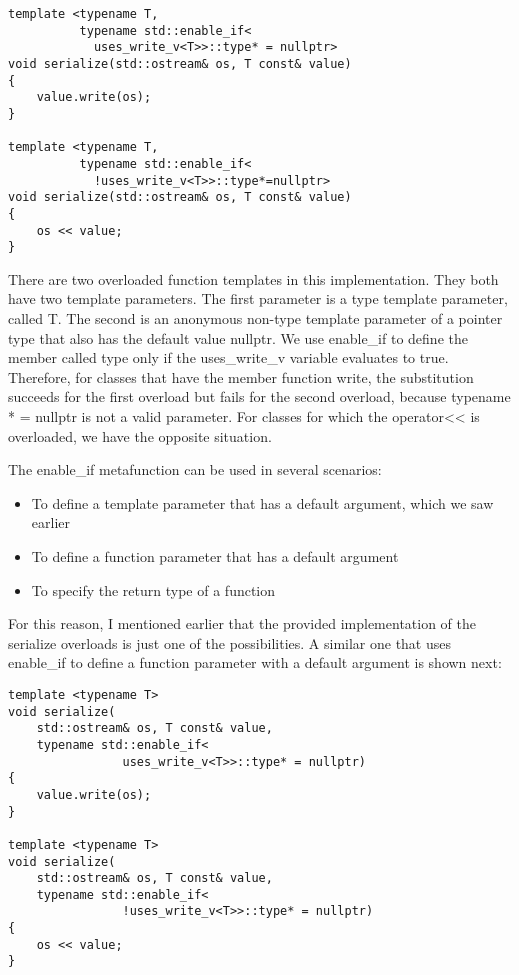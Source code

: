 \begin{lstlisting}[style=styleCXX]
template <typename T,
		  typename std::enable_if<
			uses_write_v<T>>::type* = nullptr>
void serialize(std::ostream& os, T const& value)
{
	value.write(os);
}

template <typename T,
		  typename std::enable_if<
			!uses_write_v<T>>::type*=nullptr>
void serialize(std::ostream& os, T const& value)
{
	os << value;
}
\end{lstlisting}

There are two overloaded function templates in this implementation. They both have two template parameters. The first parameter is a type template parameter, called T. The second is an anonymous non-type template parameter of a pointer type that also has the default value nullptr. We use enable\_if to define the member called type only if the uses\_write\_v variable evaluates to true. Therefore, for classes that have the member function write, the substitution succeeds for the first overload but fails for the second overload, because typename * = nullptr is not a valid parameter. For classes for which the operator<{}< is overloaded, we have the opposite situation.

The enable\_if metafunction can be used in several scenarios:

\begin{itemize}
\item
To define a template parameter that has a default argument, which we saw earlier

\item
To define a function parameter that has a default argument

\item
To specify the return type of a function
\end{itemize}

For this reason, I mentioned earlier that the provided implementation of the serialize overloads is just one of the possibilities. A similar one that uses enable\_if to define a function parameter with a default argument is shown next:

\begin{lstlisting}[style=styleCXX]
template <typename T>
void serialize(
	std::ostream& os, T const& value,
	typename std::enable_if<
				uses_write_v<T>>::type* = nullptr)
{
	value.write(os);
}

template <typename T>
void serialize(
	std::ostream& os, T const& value,
	typename std::enable_if<
				!uses_write_v<T>>::type* = nullptr)
{
	os << value;
}
\end{lstlisting}

